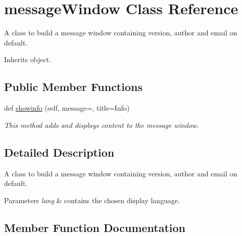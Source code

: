 \hypertarget{classgui_1_1window_1_1messageWindow}{}\section{message\+Window Class Reference}
\label{classgui_1_1window_1_1messageWindow}


A class to build a message window containing version, author and email on default.  




Inherits object.

\subsection*{Public Member Functions}
\begin{DoxyCompactItemize}
\item 
def \hyperlink{classgui_1_1window_1_1messageWindow_ac363d9b210b00523bd2d7b73e5f1a2dd}{showinfo} (self, message=\textquotesingle{}\textquotesingle{}, title=\textquotesingle{}Info\textquotesingle{})
\begin{DoxyCompactList}\small\item\em This method adds and displays content to the message window. \end{DoxyCompactList}\end{DoxyCompactItemize}


\subsection{Detailed Description}
A class to build a message window containing version, author and email on default. 


\begin{DoxyParams}{Parameters}
{\em lang} & contains the chosen display language. \\
\hline
\end{DoxyParams}


\subsection{Member Function Documentation}
